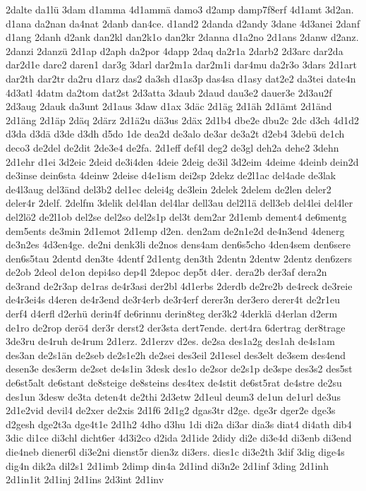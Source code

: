 {2dalte
da1lü
3dam
d1amma
4d1ammä
damo3
d2amp
damp7f8erf
4d1amt
3d2an.
d1ana
da2nan
da4nat
2danb
dan4ce.
d1and2
2danda
d2andy
3dane
4d3anei
2danf
d1ang
2danh
d2ank
dan2kl
dan2k1o
dan2kr
2danna
d1a2no
2d1ans
2danw
d2anz.
2danzi
2danzü
2d1ap
d2aph
da2por
4dapp
2daq
da2r1a
2darb2
2d3arc
dar2da
dar2d1e
dare2
daren1
dar3g
3darl
dar2m1a
dar2m1i
dar4mu
da2r3o
3dars
2d1art
dar2th
dar2tr
da2ru
d1arz
das2
da3sh
d1as3p
das4sa
d1asy
dat2e2
da3tei
date4n
4d3atl
4datm
da2tom
dat2st
2d3atta
3daub
2daud
dau3e2
dauer3e
2d3au2f
2d3aug
2dauk
da3unt
2d1aus
3daw
d1ax
3däc
2d1äg
2d1äh
2d1ämt
2d1änd
2d1äng
2d1äp
2däq
2därz
2d1ä2u
dä3us
2däx
2d1b4
dbe2e
dbu2c
2dc
d3ch
4d1d2
d3da
d3dä
d3de
d3dh
d5do
1de
dea2d
de3alo
de3ar
de3a2t
d2eb4
3debü
de1ch
deco3
de2del
de2dit
2de3e4
de2fa.
2d1eff
def4l
deg2
de3gl
deh2a
dehe2
3dehn
2d1ehr
d1ei
3d2eic
2deid
de3i4den
4deie
2deig
de3il
3d2eim
4deime
4deinb
dein2d
de3inse
dein6sta
4deinw
2deise
d4e1ism
dei2sp
2dekz
de2l1ac
del4ade
de3lak
de4l3aug
del3änd
del3b2
del1ec
delei4g
de3lein
2delek
2delem
de2len
deler2
deler4r
2delf.
2delfm
3delik
del4lan
del4lar
dell3au
del2l1ä
dell3eb
del4lei
del4ler
del2lö2
de2l1ob
del2se
del2so
del2s1p
del3t
dem2ar
2d1emb
dement4
de6mentg
dem5ents
de3min
2d1emot
2d1emp
d2en.
den2am
de2n1e2d
de4n3end
4denerg
de3n2es
4d3en4ge.
de2ni
denk3li
de2nos
dens4am
den6s5cho
4den4sem
den6sere
den6s5tau
2dentd
den3te
4dentf
2d1entg
den3th
2dentn
2dentw
2dentz
den6zers
de2ob
2deol
de1on
depi4so
dep4l
2depoc
dep5t
d4er.
dera2b
der3af
dera2n
de3rand
de2r3ap
de1ras
de4r3asi
der2bl
4d1erbs
2derdb
de2re2b
de4reck
de3reie
de4r3ei4s
d4eren
de4r3end
de3r4erb
de3r4erf
derer3n
der3ero
derer4t
de2r1eu
derf4
d4erfl
d2erhü
derin4f
de6rinnu
derin8teg
der3k2
4derklä
d4erlan
d2erm
de1ro
de2rop
derö4
der3r
derst2
der3sta
dert7ende.
dert4ra
6dertrag
der8trage
3de3ru
de4ruh
de4rum
2d1erz.
2d1erzv
d2es.
de2sa
des1a2g
des1ah
de4s1am
des3an
de2s1än
de2seb
de2s1e2h
de2sei
des3eil
2d1esel
des3elt
de3sem
des4end
desen3e
des3erm
de2set
de4s1in
3desk
des1o
de2sor
de2s1p
de3spe
des3s2
des5st
de6st5alt
de6stant
de8steige
de8steins
des4tex
de4stit
de6st5rat
de4stre
de2su
des1un
3desw
de3ta
deten4t
de2thi
2d3etw
2d1eul
deum3
de1un
de1url
de3us
2d1e2vid
devil4
de2xer
de2xis
2d1f6
2d1g2
dgas3tr
d2ge.
dge3r
dger2e
dge3s
d2gesh
dge2t3a
dge4t1e
2d1h2
4dho
d3hu
1di
di2a
di3ar
dia3s
diat4
di4ath
dib4
3dic
di1ce
di3chl
dicht6er
4d3i2co
d2ida
2d1ide
2didy
di2e
di3e4d
di3enb
di3end
die4neb
diener6l
di3e2ni
dienst5r
dien3z
di3ers.
dies1c
di3e2th
3dif
3dig
dige4s
dig4n
dik2a
dil2s1
2d1imb
2dimp
din4a
2d1ind
di3n2e
2d1inf
3ding
2d1inh
2d1in1it
2d1inj
2d1ins
2d3int
2d1inv
}
